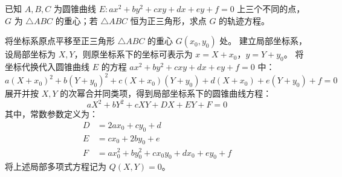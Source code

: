 \begin{example}
已知 $A, B, C$ 为圆锥曲线 \(E: ax^2 + by^2 + cxy + dx + ey + f = 0\) 上三个不同的点，\(G\) 为 \(\triangle ABC\) 的重心；若 \(\triangle ABC\) 恒为正三角形，求点 \(G\) 的轨迹方程。
\end{example}
\begin{solution}
将坐标系原点平移至正三角形 $\triangle ABC$ 的重心 $G(x_0, y_0)$ 处。
建立局部坐标系，设局部坐标为 $X, Y$，则原坐标系下的坐标可表示为 $x = X + x_0$，$y = Y + y_0$。
将坐标代换代入圆锥曲线 $E$ 的方程 $ax^2 + by^2 + cxy + dx + ey + f = 0$ 中：
$$ a(X+x_0)^2 + b(Y+y_0)^2 + c(X+x_0)(Y+y_0) + d(X+x_0) + e(Y+y_0) + f = 0 $$
展开并按 $X, Y$ 的次幂合并同类项，得到局部坐标系下的圆锥曲线方程：
$$ aX^2 + bY^2 + cXY + DX + EY + F = 0 $$
其中，常数参数定义为：
\begin{align*}
D &= 2ax_0 + cy_0 + d \\
E &= cx_0 + 2by_0 + e \\
F &= ax_0^2 + by_0^2 + cx_0 y_0 + dx_0 + ey_0 + f
\end{align*}
将上述局部多项式方程记为 $Q(X, Y) = 0$。


\end{solution}
